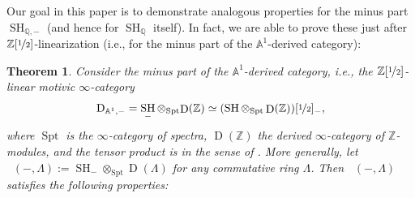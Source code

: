 \documentclass[11pt]{article}
\newcommand{\ie}{i.e.,\xspace}
\numberwithin{equation}{section}\renewcommand{\encodingdefault}{TU}
\renewcommand{\AA}{\mathbb A}
\DeclareMathOperator{\SH}{SH}
\DeclareMathOperator{\DAminus}{D_{\AA^1,-}}
\DeclareMathOperator{\Der}{D}
\DeclareMathOperator{\Spt}{Spt}
\newcommand{\ZZ} {\mathbb Z}
\newcommand{\ZZot} {\mathbb Z[\nicefrac 1 2]}
\newcommand{\ot} {{\nicefrac 1 2}}
\newcommand{\QQ} {\mathbb Q}
\newtheorem{thmi}{Theorem}
\theoremstyle{remark}
\theoremstyle{definition}
\numberwithin{equation}{thm}
\begin{document}
Our goal in this paper is to demonstrate analogous properties for the minus part $\SH_{\QQ,-}$ (and hence for $\SH_\QQ$ itself).
In fact, we are able to prove these just after $\ZZot$-linearization (\ie for the minus part of the $\AA^1$-derived category):

\begin{thmi}\label{thm:intro_SHminus}
Consider the minus part of the $\AA^1$-derived category, \ie the $\ZZot$-linear motivic $\infty$-category\vspace*{-3pt}
\[
\DAminus
= \SH_- \otimes_{\Spt} {\Der(\ZZ)}
\simeq (\SH \otimes_{\Spt} \Der(\ZZ))[\ot]_-,
\]
where $\Spt$ is the $\infty$-category of spectra, $\Der(\ZZ)$ the derived $\infty$-category of $\ZZ$-modules, and the tensor product is in the sense of \cite[\S 4.8]{LurieHA}.
More generally, let $\DAminus(-, \Lambda) := \SH_- \otimes_{\Spt} \Der(\Lambda)$ for any commutative ring $\Lambda$.
Then $\DAminus(-, \Lambda)$ satisfies the following properties:


\end{thmi}
\end{document}
